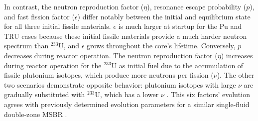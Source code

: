 In contrast, the neutron reproduction factor ($\eta$), resonance escape 
probability ($p$), and fast fission factor ($\epsilon$) differ notably between 
the initial and equilibrium state for all three initial fissile materials.  
$\epsilon$ is much larger at startup for the Pu and TRU cases because these 
initial fissile materials provide a much harder neutron spectrum than 
$^{233}$U, and $\epsilon$ grows throughout the core's lifetime. Conversely, 
$p$ decreases during reactor operation. The neutron reproduction factor ($\eta$)  
increases during reactor operation for the $^{233}$U as initial fuel due to 
the accumulation of fissile plutonium isotopes, which produce more neutrons 
per fission ($\nu$). The other two scenarios demonstrate opposite behavior: 
plutonium isotopes with large $\nu$ are gradually substituted with $^{233}$U, 
which has a lower $\nu$ \cite{sjostrand_cross_1960}. This six factors' 
evolution agrees with previously determined evolution parameters for a similar 
single-fluid double-zone \gls{MSBR} \cite{ashraf2019whole_core, 
rykhlevskii2019modeling, park_whole_2015}.